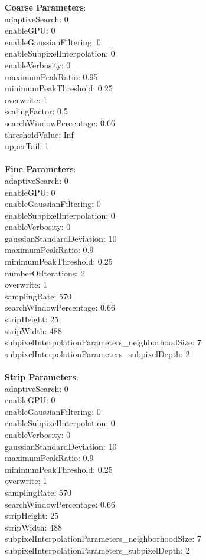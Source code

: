\documentclass[11pt]{article}
\begin{document}
\textbf{Coarse Parameters}: \\
adaptiveSearch: 0\\
enableGPU: 0\\
enableGaussianFiltering: 0\\
enableSubpixelInterpolation: 0\\
enableVerbosity: 0\\
maximumPeakRatio: 0.95\\
minimumPeakThreshold: 0.25\\
overwrite: 1\\
scalingFactor: 0.5\\
searchWindowPercentage: 0.66\\
thresholdValue: Inf\\
upperTail: 1\\
\\
\textbf{Fine Parameters}: \\
adaptiveSearch: 0\\
enableGPU: 0\\
enableGaussianFiltering: 0\\
enableSubpixelInterpolation: 0\\
enableVerbosity: 0\\
gaussianStandardDeviation: 10\\
maximumPeakRatio: 0.9\\
minimumPeakThreshold: 0.25\\
numberOfIterations: 2\\
overwrite: 1\\
samplingRate: 570\\
searchWindowPercentage: 0.66\\
stripHeight: 25\\
stripWidth: 488\\
subpixelInterpolationParameters\_neighborhoodSize: 7\\
subpixelInterpolationParameters\_subpixelDepth: 2\\
\\
\textbf{Strip Parameters}: \\
adaptiveSearch: 0\\
enableGPU: 0\\
enableGaussianFiltering: 0\\
enableSubpixelInterpolation: 0\\
enableVerbosity: 0\\
gaussianStandardDeviation: 10\\
maximumPeakRatio: 0.9\\
minimumPeakThreshold: 0.25\\
overwrite: 1\\
samplingRate: 570\\
searchWindowPercentage: 0.66\\
stripHeight: 25\\
stripWidth: 488\\
subpixelInterpolationParameters\_neighborhoodSize: 7\\
subpixelInterpolationParameters\_subpixelDepth: 2\\
\\
\newpage
\end{document}
